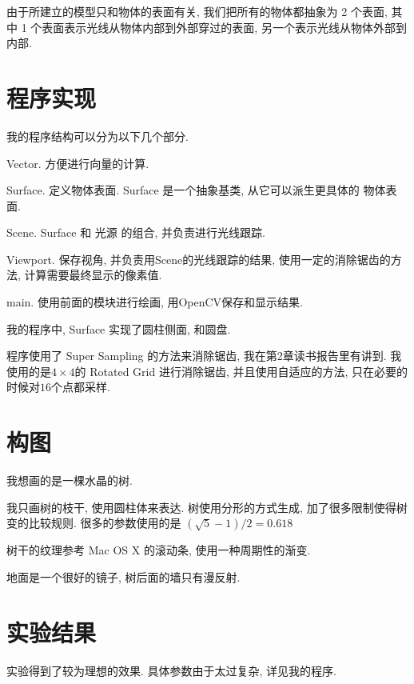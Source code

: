 \documentclass[11pt]{article}
\begin{document}
由于所建立的模型只和物体的表面有关,
我们把所有的物体都抽象为 2 个表面,
其中 1 个表面表示光线从物体内部到外部穿过的表面,
另一个表示光线从物体外部到内部.

\section{程序实现}
我的程序结构可以分为以下几个部分.

\begin{compactitem}
\item Vector. 方便进行向量的计算.
\item Surface. 定义物体表面. Surface 是一个抽象基类, 从它可以派生更具体的
      物体表面.
\item Scene. Surface 和 光源 的组合, 并负责进行光线跟踪.
\item Viewport. 保存视角, 并负责用Scene的光线跟踪的结果,
      使用一定的消除锯齿的方法, 计算需要最终显示的像素值.
\item main. 使用前面的模块进行绘画, 用OpenCV保存和显示结果.
\end{compactitem}

我的程序中, Surface 实现了圆柱侧面, 和圆盘.

程序使用了 Super Sampling 的方法来消除锯齿,
我在第2章读书报告里有讲到.
我使用的是$4\times4$的 Rotated Grid 进行消除锯齿,
并且使用自适应的方法,
只在必要的时候对$16$个点都采样.

\section{构图}
我想画的是一棵水晶的树.

我只画树的枝干, 使用圆柱体来表达.
树使用分形的方式生成,
加了很多限制使得树变的比较规则.
很多的参数使用的是 $(\sqrt{5}-1)/2 = 0.618$

树干的纹理参考 Mac OS X 的滚动条,
使用一种周期性的渐变.

地面是一个很好的镜子, 树后面的墙只有漫反射.

\section{实验结果}
实验得到了较为理想的效果. 具体参数由于太过复杂, 详见我的程序.
\end{document}

